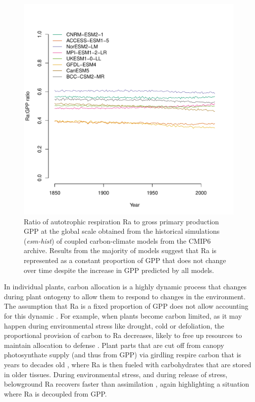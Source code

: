 \documentclass[bg, manuscript]{copernicus}
\begin{document}
\begin{figure}[t]
   \centering
   \includegraphics[scale=0.8]{annualRaGPP.pdf} %
   \caption{Ratio of autotrophic respiration Ra to gross primary production GPP at the global scale obtained from the historical simulations (\emph{esm-hist}) of coupled carbon-climate models from the CMIP6 archive. Results from the majority of models suggest that Ra is represented as a constant proportion of GPP that does not change over time despite the increase in GPP predicted by all models.}
   \label{fig:annualRaGPP}
\end{figure}

In individual plants, carbon allocation is a highly dynamic process that changes during plant ontogeny to allow them to respond to changes in the environment. The assumption that Ra is a fixed proportion of GPP does not allow accounting for this dynamic \citep{Collalti2019}. For example, when plants become carbon limited, as it may happen during environmental stress like drought, cold or defoliation, the proportional provision of carbon to Ra decreases, likely to free up resources to maintain allocation to defense \citep{Huang2019EEB,Huang2019NP}. Plant parts that are cut off from canopy photosynthate supply (and thus from GPP) via girdling respire carbon that is years to decades old \citep{muhr:2013}, where Ra is then fueled with carbohydrates that are stored in older tissues. During environmental stress, and during release of stress, belowground Ra recovers faster than assimilation \citep{Hagedorn2016}, again highlighting a situation where Ra is decoupled from GPP.
\end{document}
